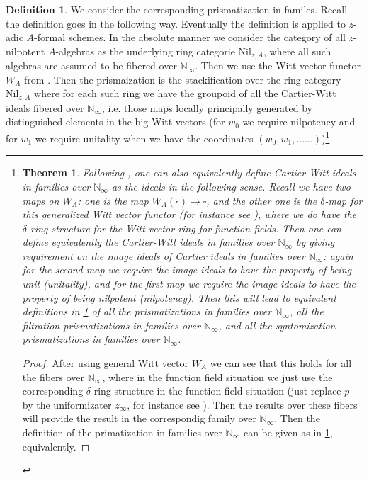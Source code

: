 \documentclass[12pt]{article}
\newtheorem{theorem}{Theorem}
\theoremstyle{definition}
\newtheorem{definition}{Definition}
\begin{document}
\begin{definition}\label{definition39}
We consider the corresponding prismatization in familes. Recall the definition goes in the following way. Eventually the definition is applied to $z$-adic $A$-formal schemes. In the absolute manner we consider the category of all $z$-nilpotent $A$-algebras as the underlying ring categorie $\mathrm{Nil}_{z,A}$, where all such algebras are assumed to be fibered over $\mathbb{N}_\infty$. Then we use the Witt vector functor $W_A$ from \cite{3LH}. Then the prismaization is the stackification over the ring category $\mathrm{Nil}_{z,A}$ where for each such ring we have the groupoid of all the Cartier-Witt ideals fibered over $\mathbb{N}_\infty$, i.e. those maps locally principally generated by distinguished elements in the big Witt vectors (for $w_0$ we require nilpotency and for $w_1$ we require unitality when we have the coordinates $(w_0,w_1,......)$)\footnote{

\begin{theorem}
Following \cite{3BL}, \cite{3D} one can also equivalently define Cartier-Witt ideals in families over $\mathbb{N}_\infty$ as the ideals in the following sense. Recall we have two maps on $W_A$: one is the map $W_A(\square)\rightarrow \square$, and the other one is the $\delta$-map for this generalized Witt vector functor (for instance see \cite{3BSI}), where we do have the $\delta$-ring structure for the Witt vector ring for function fields. Then one can define equivalently the Cartier-Witt ideals in families over $\mathbb{N}_\infty$ by giving requirement on the image ideals of Cartier ideals in families over $\mathbb{N}_\infty$: again for the second map we require the image ideals to have the property of being unit (unitality), and for the first map we require the image ideals to have the property of being nilpotent (nilpotency). Then this will lead to equivalent definitions in \cref{definition39} of all the prismatizations in families over $\mathbb{N}_\infty$, all the filtration prismatizations in families over $\mathbb{N}_\infty$, and all the syntomization prismatizations in families over $\mathbb{N}_\infty$.
\end{theorem}

\begin{proof}
After using general Witt vector $W_A$ we can see that this holds for all the fibers over $\mathbb{N}_\infty$, where in the function field situation we just use the corresponding $\delta$-ring structure in the function field situation (just replace $p$ by the uniformizater $z_\infty$, for instance see \cite{3BSI}). Then the results over these fibers will provide the result in the correspondig family over $\mathbb{N}_\infty$. Then the definition of the primatization in families over $\mathbb{N}_\infty$ can be given as in \cref{definition39}, equivalently.
\end{proof}

}
\end{definition}
\end{document}

